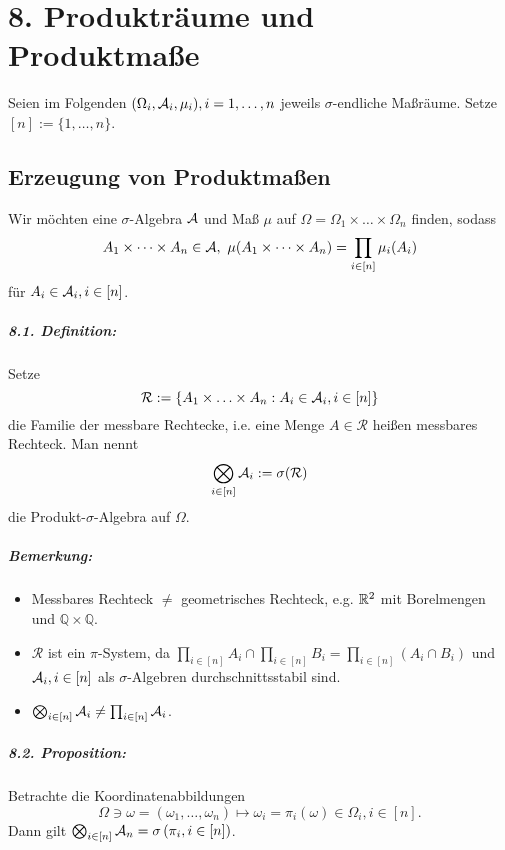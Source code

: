 \chapter*{8. Produktr\"aume und Produktma\ss{}e}
Seien im Folgenden $(\Omega_i,\mathcal{A}_i,\mu_i),i=1,\dots,n$ jeweils $\sigma$-endliche Ma\ss{}r\"aume. Setze $[n]:=\{1,\hdots,n\}$.

\section*{Erzeugung von Produktma\ss{}en}

Wir m\"ochten eine $\sigma$-Algebra $\mathcal{A}$ und Ma\ss{} $\mu$ auf $\Omega=\Omega_1\times\dots\times\Omega_n$ finden, sodass
$$A_1\times\dots\times A_n\in\mathcal{A}, \ \mu(A_1\times\dots\times A_n)=\prod_{i\in[n]}\mu_i(A_i)$$
f\"ur $A_i\in\mathcal{A}_i,i\in[n]$.

\paragraph{8.1. Definition:} Setze
$$\mathcal{R}:=\left\{A_1\times\hdots\times A_n:A_i\in\mathcal{A}_i,i\in[n]\right\}$$
die Familie der messbare Rechtecke, i.e. eine Menge $A\in\mathcal{R}$ hei\ss{}en messbares Rechteck. Man nennt 
$$\bigotimes_{i\in[n]}\mathcal{A}_i:=\sigma(\mathcal{R})$$
 die Produkt-$\sigma$-Algebra auf $\Omega$.
 
 \paragraph{Bemerkung:}
 \begin{itemize}
 	\item Messbares Rechteck $\neq$ geometrisches Rechteck, e.g. $\mathbb{R}^2$ mit Borelmengen und $\mathbb{Q}\times\mathbb{Q}$.
 	\item $\mathcal{R}$ ist ein $\pi$-System, da $\prod_{i\in[n]}A_i\cap\prod_{i\in[n]}B_i=\prod_{i\in[n]}(A_i\cap B_i)$ und $\mathcal{A}_i,i\in[n]$ als $\sigma$-Algebren durchschnittsstabil sind. 
 	\item $\bigotimes_{i\in[n]}\mathcal{A}_i\neq\prod_{i\in[n]}\mathcal{A}_i$. 
 \end{itemize}

\paragraph{8.2. Proposition:}Betrachte die Koordinatenabbildungen
$$\Omega\ni\omega=(\omega_1,\hdots,\omega_n)\mapsto\omega_i=\pi_i(\omega)\in\Omega_i,i\in[n].$$
Dann gilt $\bigotimes_{i\in[n]}\mathcal{A}_n=\sigma\left(\pi_i,i\in[n]\right)$.

